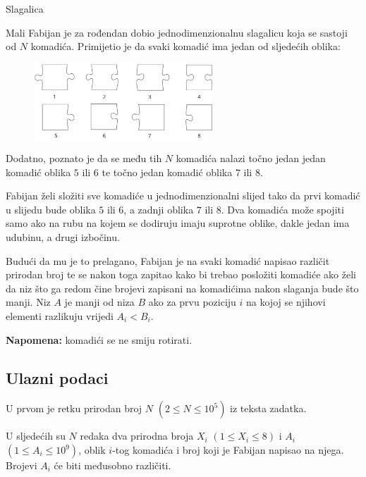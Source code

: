 \begin{statement}[
  problempoints=70,
  timelimit=1 sekunda,
  memorylimit=512 MiB,
]{Slagalica}

Mali Fabijan je za rođendan dobio jednodimenzionalnu slagalicu koja se sastoji
od $N$ komadića. Primijetio je da svaki komadić ima jedan od sljedećih oblika:
\\

\begin{figure}[H]
\centering
\includegraphics[width=0.6\textwidth]{img/puzzledef.png}
\end{figure}

Dodatno, poznato je da se među tih $N$ komadića nalazi točno jedan jedan komadić
oblika $5$ ili $6$ te točno jedan komadić oblika $7$ ili $8$.

Fabijan želi složiti sve komadiće u jednodimenzionalni slijed tako da prvi
komadić u slijedu bude oblika $5$ ili $6$, a zadnji oblika $7$ ili $8$.
Dva komadića može spojiti samo ako na rubu na kojem se dodiruju imaju suprotne
oblike, dakle jedan ima udubinu, a drugi izbočinu.

Budući da mu je to prelagano, Fabijan je na svaki komadić napisao različit
prirodan broj te se nakon toga zapitao kako bi trebao posložiti komadiće ako
želi da niz što ga redom čine brojevi zapisani na komadićima nakon slaganja bude
što manji. Niz $A$ je manji od niza $B$ ako za prvu poziciju $i$ na kojoj se
njihovi elementi razlikuju vrijedi $A_i < B_i$.

\textbf{Napomena:} komadići se ne smiju rotirati.

\subsection*{Ulazni podaci}
U prvom je retku prirodan broj $N$ $(2 \le N \le 10^5)$ iz teksta zadatka.

U sljedećih su $N$ redaka dva prirodna broja $X_i$ $(1 \le X_i \le 8)$ i $A_i$
$(1 \le A_i \le 10^9)$, oblik $i$-tog komadića i broj koji je Fabijan napisao na
njega. Brojevi $A_i$ će biti međusobno različiti.


\end{statement}
